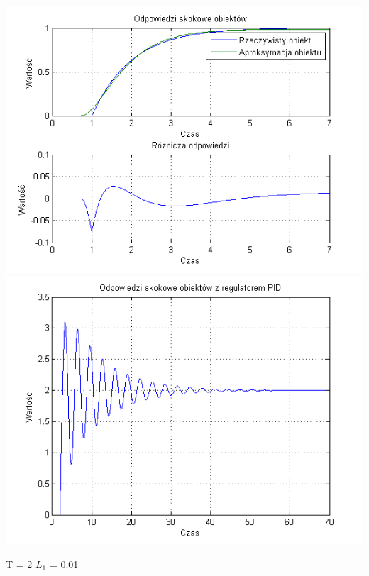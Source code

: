 \documentclass[10pt,a4paper]{article}
\begin{document}
\begin{center}
\includegraphics[scale=1]{images/dwa/skrypt_169.png}\\
\includegraphics[scale=1]{images/dwa/skrypt_170.png}\\
\end{center}
\newpage
T = 2
$L_1$ = 0.01
\end{document}
